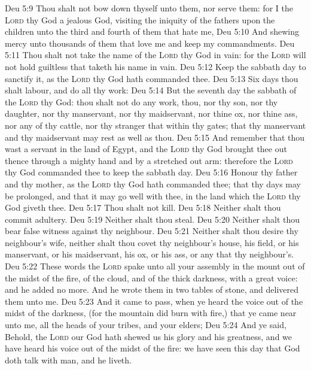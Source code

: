 \vs Deu 5:9 Thou shalt not bow down thyself unto them, nor serve them: for I the \textsc{Lord} thy God  a jealous God, visiting the iniquity of the fathers upon the children unto the third and fourth  of them that hate me,
\vs Deu 5:10 And shewing mercy unto thousands of them that love me and keep my commandments.
\vs Deu 5:11 Thou shalt not take the name of the \textsc{Lord} thy God in vain: for the \textsc{Lord} will not hold  guiltless that taketh his name in vain.
\vs Deu 5:12 Keep the sabbath day to sanctify it, as the \textsc{Lord} thy God hath commanded thee.
\vs Deu 5:13 Six days thou shalt labour, and do all thy work:
\vs Deu 5:14 But the seventh day  the sabbath of the \textsc{Lord} thy God:  thou shalt not do any work, thou, nor thy son, nor thy daughter, nor thy manservant, nor thy maidservant, nor thine ox, nor thine ass, nor any of thy cattle, nor thy stranger that  within thy gates; that thy manservant and thy maidservant may rest as well as thou.
\vs Deu 5:15 And remember that thou wast a servant in the land of Egypt, and  the \textsc{Lord} thy God brought thee out thence through a mighty hand and by a stretched out arm: therefore the \textsc{Lord} thy God commanded thee to keep the sabbath day.
\vs Deu 5:16 Honour thy father and thy mother, as the \textsc{Lord} thy God hath commanded thee; that thy days may be prolonged, and that it may go well with thee, in the land which the \textsc{Lord} thy God giveth thee.
\vs Deu 5:17 Thou shalt not kill.
\vs Deu 5:18 Neither shalt thou commit adultery.
\vs Deu 5:19 Neither shalt thou steal.
\vs Deu 5:20 Neither shalt thou bear false witness against thy neighbour.
\vs Deu 5:21 Neither shalt thou desire thy neighbour's wife, neither shalt thou covet thy neighbour's house, his field, or his manservant, or his maidservant, his ox, or his ass, or any  that  thy neighbour's.
\vs Deu 5:22 These words the \textsc{Lord} spake unto all your assembly in the mount out of the midst of the fire, of the cloud, and of the thick darkness, with a great voice: and he added no more. And he wrote them in two tables of stone, and delivered them unto me.
\vs Deu 5:23 And it came to pass, when ye heard the voice out of the midst of the darkness, (for the mountain did burn with fire,) that ye came near unto me,  all the heads of your tribes, and your elders;
\vs Deu 5:24 And ye said, Behold, the \textsc{Lord} our God hath shewed us his glory and his greatness, and we have heard his voice out of the midst of the fire: we have seen this day that God doth talk with man, and he liveth.

